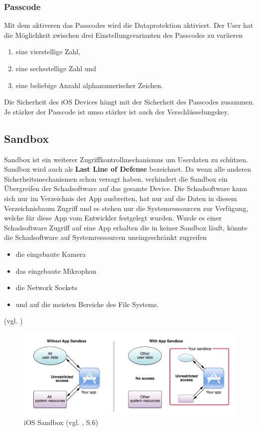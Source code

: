 \subsubsection{Passcode}
\label{sec:Passcode}

Mit dem aktiveren das Passcodes wird die Dataprotektion aktiviert. Der User hat die Möglichkeit zwischen drei Einstellungsvarianten des Passcodes zu variieren
\begin{enumerate}
    \item eine vierstellige Zahl,
    \item eine sechsstellige Zahl und
    \item eine beliebige Anzahl alphanumerischer Zeichen.
\end{enumerate}
Die Sicherheit des iOS Devices hängt mit der Sicherheit des Passcodes zusammen. Je stärker der Passcode ist umso stärker ist auch der Verschlüsselungskey.


\subsection{Sandbox}
\label{sec:Sandbox}

Sandbox ist ein weiterer Zugriffkontrollmechanismus um Userdaten zu schützen. Sandbox wird auch als \textbf{Last Line of Defense} bezeichnet. Da wenn alle anderen Sicherheitsmechanismen schon versagt haben, verhindert die Sandbox ein Übergreifen der Schadsoftware auf das gesamte Device. Die Schadsoftware kann sich nur im Verzeichnis der App ausbreiten, hat nur auf die Daten in diesem Verzeichnisbaum Zugriff und es stehen nur die Systemressourcen zur Verfügung, welche für diese App vom Entwickler festgelegt wurden. Wurde es einer Schadsoftware Zugriff auf eine App erhalten die in keiner Sandbox läuft, könnte die Schadsoftware auf Systemressourcen uneingeschränkt zugreifen
\begin{itemize}
    \item die eingebaute Kamera
    \item das eingebaute Mikrophon
    \item die Network Sockets
    \item und auf die meisten Bereiche des File Systems.
\end{itemize}

(vgl. \cite{Apple[6], Sandbox[1], Sandbox[2],Sandbox[3], Sandbox[4], Sandbox[5]})

\begin{figure}[!ht]
        \centering
                \includegraphics[scale=0.6]{iOSsandbox}
        \caption{iOS Sandbox (vgl. \cite{Sandbox[3]}, S.6)}
        \label{fig:iOSsandbox}
\end{figure}

